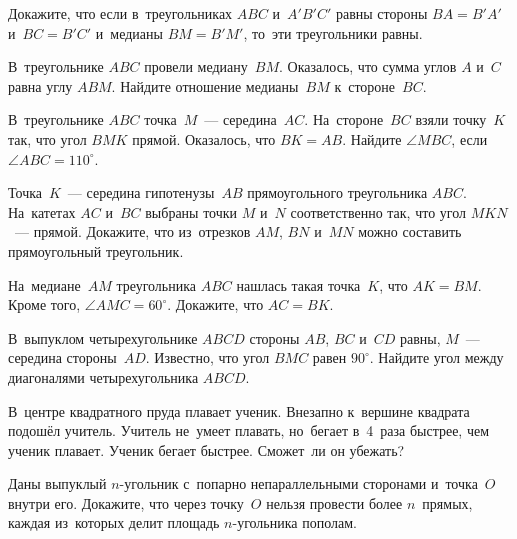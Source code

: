 



\begin{problems}

\item
Докажите, что если в~треугольниках $ABC$ и~$A'B'C'$ равны стороны $BA = B'A'$
и~$BC = B'C'$ и~медианы $BM = B'M'$, то~эти треугольники равны.

\item
В~треугольнике $ABC$ провели медиану~$BM$.
Оказалось, что сумма углов $A$ и~$C$ равна углу $ABM$.
Найдите отношение медианы~$BM$ к~стороне~$BC$.

\item
В~треугольнике $ABC$ точка~$M$~--- середина~$AC$.
На~стороне~$BC$ взяли точку~$K$ так, что угол $BMK$ прямой.
Оказалось, что $BK = AB$.
Найдите $\angle MBC$, если $\angle ABC = 110^{\circ}$.

\item
Точка~$K$~--- середина гипотенузы~$AB$ прямоугольного треугольника $ABC$.
На~катетах $AC$ и~$BC$ выбраны точки $M$ и~$N$ соответственно так, что
угол $MKN$~--- прямой.
Докажите, что из~отрезков $AM$, $BN$ и~$MN$ можно составить прямоугольный
треугольник.

\item
На~медиане~$AM$ треугольника $ABC$ нашлась такая точка~$K$, что  $AK = BM$.
Кроме того, $\angle AMC = 60^{\circ}$.
Докажите, что $AC = BK$.

\item
В~выпуклом четырехугольнике $ABCD$ стороны $AB$, $BC$ и~$CD$ равны,
$M$~--- середина стороны~$AD$.
Известно, что угол $BMC$ равен $90^\circ$.
Найдите угол между диагоналями четырехугольника $ABCD$.

\item
В~центре квадратного пруда плавает ученик.
Внезапно к~вершине квадрата подошёл учитель.
Учитель не~умеет плавать, но~бегает в~4~раза быстрее, чем ученик плавает.
Ученик бегает быстрее.
Сможет~ли он убежать?

\item
Даны выпуклый $n$-угольник с~попарно непараллельными сторонами и~точка~$O$
внутри его.
Докажите, что через точку~$O$ нельзя провести более $n$~прямых, каждая
из~которых делит площадь $n$-угольника пополам.

\end{problems}

